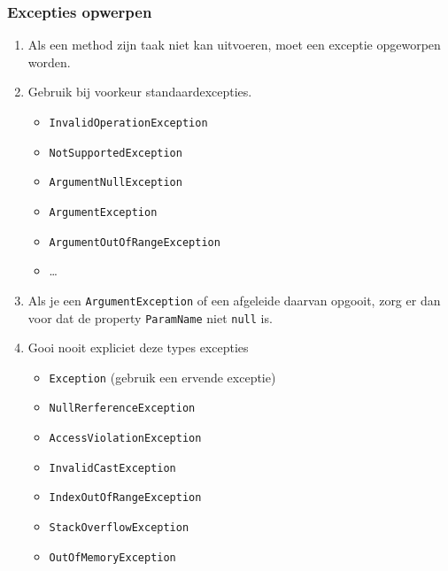 \documentclass[a4paper,11pt]{article}
\begin{document}
\subsubsection{Excepties opwerpen}
\begin{enumerate}[resume]
\item Als een method zijn taak niet kan uitvoeren, moet een exceptie
opgeworpen worden.
\item Gebruik bij voorkeur standaardexcepties.
\begin{itemize}
\item \lstinline !InvalidOperationException!
\item \lstinline !NotSupportedException!
\item \lstinline !ArgumentNullException!
\item \lstinline !ArgumentException!
\item \lstinline !ArgumentOutOfRangeException!
\item \ldots
\end{itemize}
\item Als je een \lstinline !ArgumentException! of een afgeleide daarvan
opgooit, zorg er dan voor dat de property \lstinline !ParamName! niet
\lstinline !null! is.
\item Gooi nooit expliciet deze types excepties
\begin{itemize}
\item \lstinline !Exception! (gebruik een ervende exceptie)
\item \lstinline !NullRerferenceException!
\item \lstinline !AccessViolationException!
\item \lstinline !InvalidCastException!
\item \lstinline !IndexOutOfRangeException!
\item \lstinline !StackOverflowException!
\item \lstinline !OutOfMemoryException!
\end{itemize}
\end{enumerate}
\end{document}
